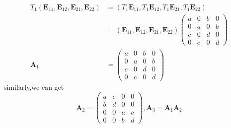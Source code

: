 \documentclass[12pt,a4paper]{article}
\begin{document}
\begin{equation*}
\begin{split}
T_1(\bm{E}_{11},\bm{E}_{12},\bm{E}_{21},\bm{E}_{22}) 
&= (T_1\bm{E}_{11},T_1\bm{E}_{12},T_1\bm{E}_{21},T_1\bm{E}_{22}) \\
&= (\bm{E}_{11},\bm{E}_{12},\bm{E}_{21},\bm{E}_{22})
\left( \begin{array}{cccc}
a & 0 & b & 0\\
0 & a & 0 & b\\
c & 0 & d & 0 \\
0 & c & 0 & d
\end{array} 
\right)  \\
\bm{A}_1 &= \left( \begin{array}{cccc}
a & 0 & b & 0\\
0 & a & 0 & b\\
c & 0 & d & 0 \\
0 & c & 0 & d
\end{array} 
\right) 
\end{split}
\end{equation*}
\qquad similarly,we can get 
\begin{equation*}
\bm{A}_2 = \left(\begin{array}{cccc}
a & c & 0 & 0 \\
b & d & 0 & 0 \\
0 & 0 & a & c\\
0 & 0 & b & d
\end{array} 
\right),\bm{A}_3 = \bm{A}_1\bm{A}_2 
\end{equation*}
\end{document}
